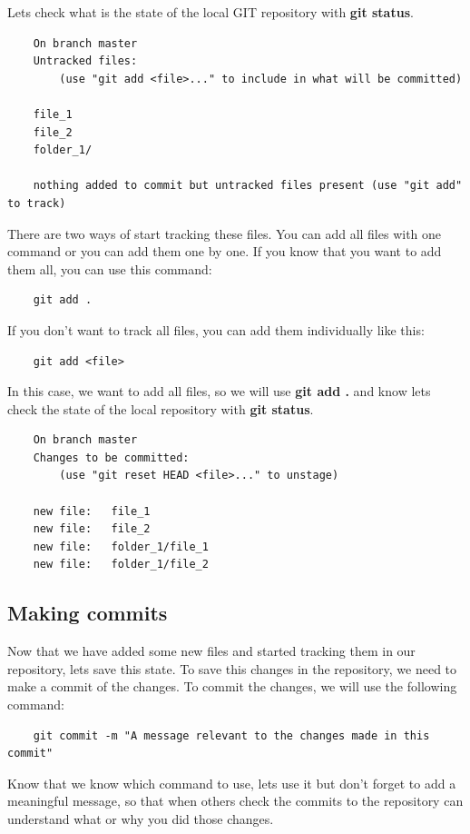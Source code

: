 \documentclass{article}
\begin{document}
Lets check what is the state of the local GIT repository with \textbf{git status}.

\begin{lstlisting}
	On branch master
	Untracked files:
		(use "git add <file>..." to include in what will be committed)

	file_1
	file_2
	folder_1/

	nothing added to commit but untracked files present (use "git add" to track)
\end{lstlisting}

There are two ways of start tracking these files. You can add all files with one command or you can add them one by one. If you know that you want to add them all, you can use this command:

\begin{lstlisting}
	git add .
\end{lstlisting}

If you don't want to track all files, you can add them individually like this:

\begin{lstlisting}
	git add <file>
\end{lstlisting}

In this case, we want to add all files, so we will use \textbf{git add .} and know lets check the state of the local repository with \textbf{git status}.

\begin{lstlisting}
	On branch master
	Changes to be committed:
  		(use "git reset HEAD <file>..." to unstage)

	new file:   file_1
	new file:   file_2
	new file:   folder_1/file_1
	new file:   folder_1/file_2
\end{lstlisting}

\subsection{Making commits}

Now that we have added some new files and started tracking them in our repository, lets save this state. To save this changes in the repository, we need to make a commit of the changes. To commit the changes, we will use the following command:

\begin{lstlisting}
	git commit -m "A message relevant to the changes made in this commit"
\end{lstlisting}

Know that we know which command to use, lets use it but don't forget to add a meaningful message, so that when others check the commits to the repository can understand what or why you did those changes.\\
\end{document}
